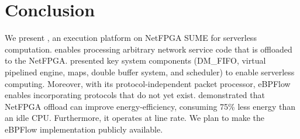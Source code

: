 \section{Conclusion}
\label{sec:conclusion}

We present \system, an execution platform on NetFPGA SUME for serverless computation. \system enables processing arbitrary network service code that is offloaded to the NetFPGA.  
\system presented key system components (DM\_FIFO, virtual pipelined engine, maps, double buffer system, and scheduler) to enable serverless computing.
Moreover, with its protocol-independent packet processor, eBPFlow enables incorporating protocols that do not yet exist.
\system demonstrated that NetFPGA offload can improve energy-efficiency, consuming 75\% less energy than an idle CPU.
Furthermore, it operates at line rate.
We plan to make the eBPFlow implementation publicly available.
